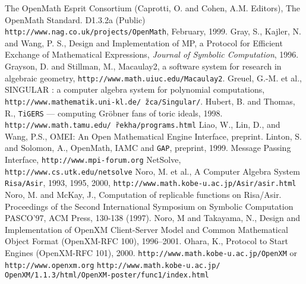 
\begin{thebibliography}{X}
The OpenMath Esprit Consortium 
(Caprotti, O. and Cohen, A.M. Editors),
The OpenMath Standard. D1.3.2a (Public) \\
{\small {\tt http://www.nag.co.uk/projects/OpenMath}},
February, 1999.
Gray, S., Kajler, N. and Wang, P. S.,
Design and Implementation of MP, a Protocol for Efficient
  Exchange of Mathematical Expressions,
{\sl Journal of Symbolic Computation}, 1996.
Grayson, D. and Stillman, M.,
Macaulay2, a software system for research in algebraic geometry,
 {\small {\tt http://www.math.uiuc.edu/Macaulay2}}.
Greuel, G.-M. et al., SINGULAR : a computer algebra system for polynomial
computations,
{\small {\tt http://www.mathematik.uni-kl.de/\~\,zca/Singular/}}.
Hubert, B. and Thomas, R.,
{\tt TiGERS} --- computing Gr\"obner fans of toric
ideals, 1998.
{\small
{\tt http://www.math.tamu.edu/\~\,rekha/programs.html}}
Liao, W., Lin, D., and Wang, P.S.,
{OMEI: An Open Mathematical Engine Interface},
preprint.
Linton, S. and Solomon, A.,
OpenMath, IAMC and {\tt GAP},
preprint, 1999.
 Message Passing Interface,
{\small {\tt http://www.mpi-forum.org}} 
NetSolve, {\small {\tt http://www.cs.utk.edu/netsolve}}
Noro, M. et al., 
A Computer Algebra System {\tt Risa/Asir},  1993, 1995, 2000,
{\small {\tt http://www.math.kobe-u.ac.jp/Asir/asir.html}}
Noro, M. and McKay, J.,
Computation of replicable functions on Risa/Asir.
Proceedings of the Second International Symposium on
Symbolic Computation PASCO'97, ACM Press, 130-138 (1997).
Noro, M and Takayama, N., Design and Implementation
of OpenXM Client-Server Model and Common Mathematical Object Format
(OpenXM-RFC 100), 1996--2001.
Ohara, K.,
Protocol to Start Engines (OpenXM-RFC 101),
2000.
{\small {\tt http://www.math.kobe-u.ac.jp/OpenXM}}
or 
{\small {\tt http://www.openxm.org}}
{\small {\tt http://www.math.kobe-u.ac.jp/ \\ OpenXM/1.1.3/html/OpenXM-poster/func1/index.html}}

\end{thebibliography}
